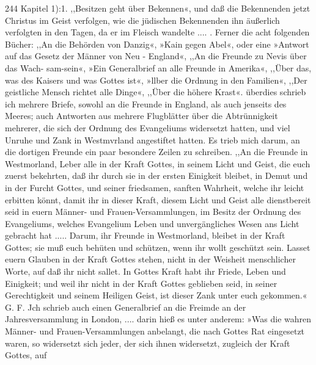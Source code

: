 244 Kapitel 1):1.
,,Besitzen geht über Bekennen«, und daß die Bekennenden jetzt
Christus im Geist verfolgen, wie die jüdischen Bekennenden ihn
äußerlich verfolgten in den Tagen, da er im Fleisch wandelte .... .
Ferner die acht folgenden Bücher: ,,An die Behörden von Danzig«,
»Kain gegen Abel«, oder eine »Antwort auf das Gesetz der Männer
von Neu - England«, ,,An die Freunde zu Nevis über das Wach-
sam-sein«, »Ein Generalbrief an alle Freunde in Amerika«,
,,Über das, was des Kaisers und was Gottes ist«, »llber die
Ordnung in den Familien«, ,,Der geistliche Mensch richtet alle
Dinge«, ,,Über die höhere Krast«.
überdies schrieb ich mehrere Briefe, sowohl an die Freunde
in England, als auch jenseits des Meeres; auch Antworten
aus mehrere Flugblätter über die Abtrünnigkeit mehrerer, die
sich der Ordnung des Evangeliums widersetzt hatten, und viel
Unruhe und Zank in Westmvrland angestiftet hatten. Es trieb
mich darum, an die dortigen Freunde ein paar besondere Zeilen
zu schreiben.
,,An die Freunde in Westmorland,
Leber alle in der Kraft Gottes, in seinem Licht und Geist,
die euch zuerst bekehrten, daß ihr durch sie in der ersten Einigkeit
bleibet, in Demut und in der Furcht Gottes, und seiner friedsamen,
sanften Wahrheit, welche ihr leicht erbitten könnt, damit ihr in
dieser Kraft, diesem Licht und Geist alle dienstbereit seid in euern
Männer- und Frauen-Versammlungen, im Besitz der Ordnung
des Evangeliums, welches Evangelium Leben und unvergängliches
Wesen ans Licht gebracht hat ..... Darum, ihr Freunde in
Westmorland, bleibet in der Kraft Gottes; sie muß euch behüten
und schützen, wenn ihr wollt geschützt sein. Lasset euern Glauben
in der Kraft Gottes stehen, nicht in der Weisheit menschlicher
Worte, auf daß ihr nicht sallet. In Gottes Kraft habt ihr
Friede, Leben und Einigkeit; und weil ihr nicht in der Kraft
Gottes geblieben seid, in seiner Gerechtigkeit und seinem Heiligen
Geist, ist dieser Zank unter euch gekommen.« G. F.
Jch schrieb auch einen Generalbrief an die Freimde an der
Jahresversammlung in London, .... darin hieß es unter
anderem:
»Was die wahren Männer- und Frauen-Versammlungen
anbelangt, die nach Gottes Rat eingesetzt waren, so widersetzt
sich jeder, der sich ihnen widersetzt, zugleich der Kraft Gottes, auf


